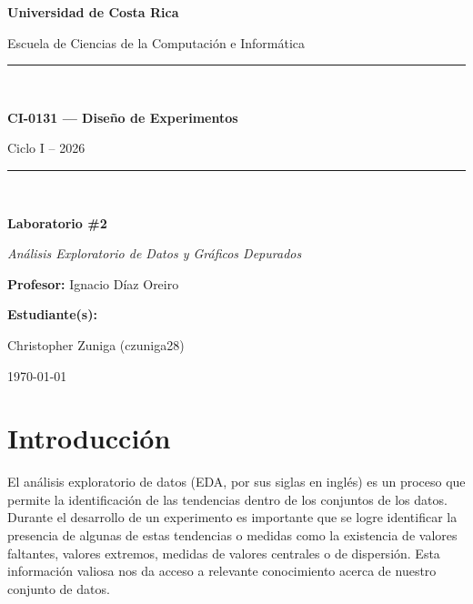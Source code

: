 \documentclass[11pt,a4paper]{article}
\begin{document}
\begin{titlepage}
  \centering
  \vspace*{2cm}
  {\Large \textbf{Universidad de Costa Rica} \par}
  \vspace{0.5cm}
  {\large Escuela de Ciencias de la Computación e Informática \par}
  \vspace{1.5cm}
  \rule{\linewidth}{0.5pt}\\[0.4cm]
  {\LARGE \textbf{CI-0131 --- Diseño de Experimentos} \par}
  \vspace{0.3cm}
  {\Large Ciclo I -- 2026 \par}
  \rule{\linewidth}{0.5pt}\\[1cm]
  {\Huge \textbf{Laboratorio \#2} \par}
  \vspace{0.5cm}
  {\Large \textit{Análisis Exploratorio de Datos y Gráficos Depurados} \par}
  \vspace{2cm}
  {\large \textbf{Profesor:} Ignacio Díaz Oreiro \par}
  \vspace{2cm}
  {\large \textbf{Estudiante(s):} \par}
  \vspace{0.4cm}
  {\large Christopher Zuniga \hspace{1cm} (czuniga28) \par}
  \vfill
  {\large \today \par}
\end{titlepage}

\tableofcontents
\newpage

\section{Introducción}

El análisis exploratorio de datos (EDA, por sus siglas en inglés) es un proceso que permite la identificación
de las tendencias dentro de los conjuntos de los datos. Durante el desarrollo de un experimento es importante
que se logre identificar la presencia de algunas de estas tendencias o medidas como la existencia de valores
faltantes, valores extremos, medidas de valores centrales o de dispersión. Esta información valiosa nos da
acceso a relevante conocimiento acerca de nuestro conjunto de datos.
\end{document}
